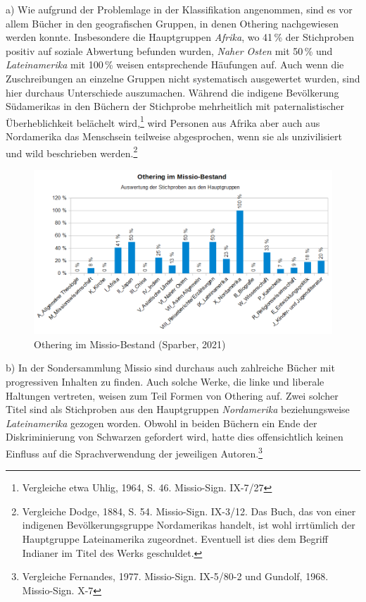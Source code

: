 \documentclass[a4paper,
fontsize=11pt,
oneside,
numbers=noperiodatend,
parskip=half-,
bibliography=totoc,
final
]{scrartcl}
\begin{document}
a) Wie aufgrund der Problemlage in der Klassifikation angenommen, sind
es vor allem Bücher in den geografischen Gruppen, in denen Othering
nachgewiesen werden konnte. Insbesondere die Hauptgruppen \emph{Afrika},
wo 41\,\% der Stichproben positiv auf soziale Abwertung befunden wurden,
\emph{Naher Osten} mit 50\,\% und \emph{Lateinamerika} mit 100\,\%
weisen entsprechende Häufungen auf. Auch wenn die Zuschreibungen an
einzelne Gruppen nicht systematisch ausgewertet wurden, sind hier
durchaus Unterschiede auszumachen. Während die indigene Bevölkerung
Südamerikas in den Büchern der Stichprobe mehrheitlich mit
paternalistischer Überheblichkeit belächelt wird,\footnote{Vergleiche
  etwa Uhlig, 1964, S. 46. Missio-Sign. IX-7/27} wird Personen aus
Afrika aber auch aus Nordamerika das Menschsein teilweise abgesprochen,
wenn sie als unzivilisiert und wild beschrieben werden.\footnote{Vergleiche
  Dodge, 1884, S. 54. Missio-Sign. IX-3/12. Das Buch, das von einer
  indigenen Bevölkerungsgruppe Nordamerikas handelt, ist wohl irrtümlich
  der Hauptgruppe Lateinamerika zugeordnet. Eventuell ist dies dem
  Begriff Indianer im Titel des Werks geschuldet.}

\begin{figure}
\centering
\includegraphics[width=.95\textwidth]{img/img3.png}
\caption{Othering im Missio-Bestand (Sparber, 2021)}
\end{figure}

b) In der Sondersammlung Missio sind durchaus auch zahlreiche Bücher mit
progressiven Inhalten zu finden. Auch solche Werke, die linke und
liberale Haltungen vertreten, weisen zum Teil Formen von Othering auf.
Zwei solcher Titel sind als Stichproben aus den Hauptgruppen
\emph{Nordamerika} beziehungsweise \emph{Lateinamerika} gezogen worden.
Obwohl in beiden Büchern ein Ende der Diskriminierung von Schwarzen
gefordert wird, hatte dies offensichtlich keinen Einfluss auf die
Sprachverwendung der jeweiligen Autoren.\footnote{Vergleiche Fernandes,
  1977. Missio-Sign. IX-5/80-2 und Gundolf, 1968. Missio-Sign. X-7}
\end{document}
